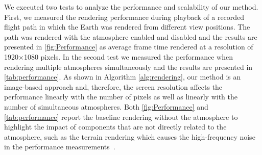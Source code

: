 \documentclass[journal]{vgtc}                %
\begin{document}

We executed two tests to analyze the performance and scalability of our method.
First, we measured the rendering performance during playback of a recorded flight path in which the Earth was rendered from different view positions. The path was rendered with the atmosphere enabled and disabled and the results are presented in \autoref{fig:Performance} as average frame time rendered at a resolution of 1920$\times$1080 pixels.
In the second test we measured the performance when rendering multiple atmospheres simultaneously and the results are presented in \autoref{tab:performance}. As shown in Algorithm \autoref{alg:rendering}, our method is an image-based approach and, therefore, the screen resolution affects the performance linearly with the number of pixels as well as linearly with the number of simultaneous atmospheres. Both \autoref{fig:Performance} and \autoref{tab:performance} report the baseline rendering without the atmosphere to highlight the impact of components that are not directly related to the atmosphere, %
such as the terrain rendering which causes the high-frequency noise in the performance measurements~\cite{bladin17globe}. 

%

\end{document}
